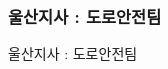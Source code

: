 \documentclass[aspectratio=1610,20pt,xcolor=pdftex,dvipsnames,table,handout]{beamer}
\begin{document}
		\begin{frame} [t,plain]
		\frametitle{울산지사 : 도로안전팀 }

			\begin{block} {울산지사 : 도로안전팀 }
			\setlength{\leftmargini}{2em}			
			\end{block}	

		   \begin{center}
			\label{table:second}
			\setlength{\tabcolsep}{0pt}

			\footnotesize {

		     	\begin{tabularx}{\textwidth}{ p{} p{} p{} p{}   }\hline


\end{tabularx}}
\end{center}
\end{frame}
\end{document}
